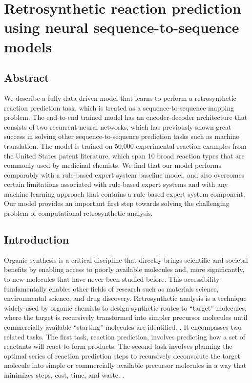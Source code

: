\section{Retrosynthetic reaction prediction using neural sequence-to-sequence models}

\subsection{Abstract}
We describe a fully data driven model that learns to perform a retrosynthetic reaction prediction task, which is treated as a sequence-to-sequence mapping problem. The end-to-end trained model has an encoder-decoder architecture that consists of two recurrent neural networks, which has previously shown great success in solving other sequence-to-sequence prediction tasks such as machine translation. The model is trained on 50,000 experimental reaction examples from the United States patent literature, which span 10 broad reaction types that are commonly used by medicinal chemists. We find that our model performs comparably with a rule-based expert system baseline model, and also overcomes certain limitations associated with rule-based expert systems and with any machine learning approach that contains a rule-based expert system component. Our model provides an important first step towards solving the challenging problem of computational retrosynthetic analysis. 

\subsection{Introduction}
Organic synthesis is a critical discipline that directly brings scientific and societal benefits by enabling access to poorly available molecules and, more significantly, to new molecules that have never been studied before. This accessibility fundamentally enables other fields of research such as materials science, environmental science, and drug discovery. Retrosynthetic analysis is a technique widely-used by organic chemists to design synthetic routes to “target” molecules, where the target is recursively transformed into simpler precursor molecules until commercially available “starting” molecules are identified. \cite{corey1989logic, corey1967general, corey1967general}. It encompasses two related tasks. The first task, reaction prediction, involves predicting how a set of reactants will react to form products. The second task involves planning the optimal series of reaction prediction steps to recursively deconvolute the target molecule into simple or commercially available precursor molecules in a way that minimizes steps, cost, time, and waste. \cite{wender2014toward, wender2015function}.

